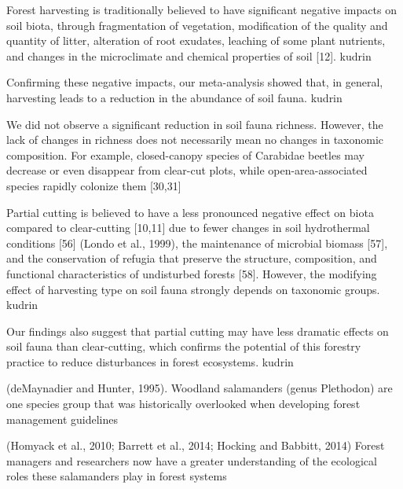Forest harvesting is traditionally believed to have significant negative impacts on soil biota, through fragmentation of vegetation, modification of the quality and quantity of litter, alteration of root exudates, leaching of some plant nutrients, and changes in the microclimate and chemical properties of soil [12]. kudrin

Confirming these negative impacts, our meta-analysis showed that, in general, harvesting leads to a reduction in the abundance of soil fauna. kudrin

We did not observe a significant reduction in soil fauna richness. However, the lack of changes in richness does not necessarily mean no changes in taxonomic composition. For example, closed-canopy species of Carabidae beetles may decrease or even disappear from clear-cut plots, while open-area-associated species rapidly colonize them [30,31]

Partial cutting is believed to have a less pronounced negative effect on biota compared to clear-cutting [10,11] due to fewer changes in soil hydrothermal conditions [56] (Londo et al., 1999), the maintenance of microbial biomass [57], and the conservation of refugia that preserve the structure, composition, and functional characteristics of undisturbed forests [58]. However, the modifying effect of harvesting type on soil fauna strongly depends on taxonomic groups. kudrin

Our findings also suggest that partial cutting may have less dramatic effects on soil fauna than clear-cutting, which confirms the potential of this forestry practice to reduce disturbances in forest ecosystems. kudrin


(deMaynadier and Hunter, 1995). Woodland salamanders (genus Plethodon) are one species group that was historically overlooked when developing forest management guidelines 


(Homyack et al., 2010; Barrett et al., 2014; Hocking and Babbitt, 2014) Forest managers and researchers now have a greater understanding of the ecological roles these salamanders play in forest systems 

